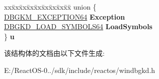 \begin{DoxyCompactItemize}
\item 
\mbox{\label{struct___d_b_g_k_d___w_a_i_t___s_t_a_t_e___c_h_a_n_g_e64_a892541297107d6e181ab40e71b5972b5}} 
\begin{tabbing}
xx\=xx\=xx\=xx\=xx\=xx\=xx\=xx\=xx\=\kill
union \{\\
\>\hyperlink{struct___d_b_g_k_m___e_x_c_e_p_t_i_o_n64}{DBGKM\_EXCEPTION64} {\bfseries Exception}\\
\>\hyperlink{struct___d_b_g_k_d___l_o_a_d___s_y_m_b_o_l_s64}{DBGKD\_LOAD\_SYMBOLS64} {\bfseries LoadSymbols}\\
\} {\bfseries u}\\

\end{tabbing}\end{DoxyCompactItemize}


该结构体的文档由以下文件生成\+:\begin{DoxyCompactItemize}
\item 
E\+:/\+React\+O\+S-\/0../sdk/include/reactos/windbgkd.\+h\end{DoxyCompactItemize}
